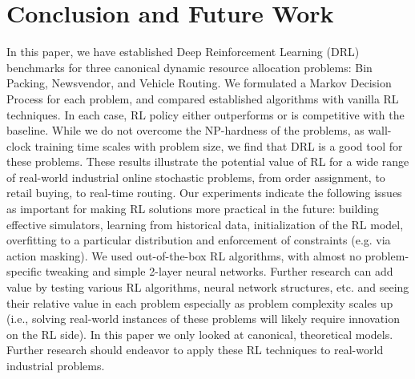 \documentclass[letterpaper]{article} %
\begin{document}
\section{Conclusion and Future Work}	
In this paper, we have established Deep Reinforcement Learning (DRL) benchmarks for three canonical dynamic resource allocation problems: Bin Packing, Newsvendor, and Vehicle Routing. We formulated a Markov Decision Process for each problem, and compared established algorithms with vanilla RL techniques. In each case, RL policy either outperforms or is competitive with the baseline. While we do not overcome the NP-hardness of the problems, as wall-clock training time scales with problem size, we find that DRL is a good tool for these problems. %
These results illustrate the potential value of RL for a wide range of real-world industrial online stochastic problems, from order assignment, to retail buying, to real-time routing. Our experiments indicate the following issues as important for making RL solutions more practical in the future: building effective simulators, learning from historical data, initialization of the RL model, overfitting to a particular distribution and enforcement of constraints (e.g. via action masking). 
We used out-of-the-box RL algorithms, with almost no problem-specific tweaking and simple 2-layer neural networks.  Further research can add value by testing various RL algorithms, neural network structures, etc. and seeing their relative value in each problem especially as problem complexity scales up (i.e., solving real-world instances of these problems will likely require innovation on the RL side).  In this paper we only looked at canonical, theoretical models. Further research should endeavor to apply these RL techniques to real-world industrial problems.  




\end{document}
